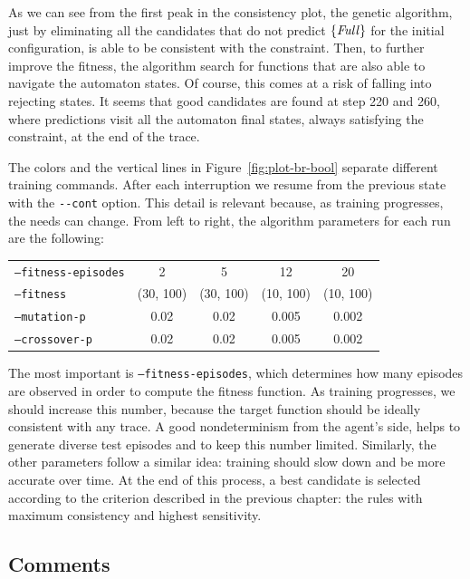 As we can see from the first peak in the consistency plot, the genetic
algorithm, just by eliminating all the candidates that do not predict
$\{\text{\textit{Full}}\}$ for the initial configuration, is able to be consistent
with the constraint. Then, to further improve the fitness, the algorithm
search for functions that are also able to navigate the automaton states. Of
course, this comes at a risk of falling into rejecting states.
It seems that good candidates are found at step 220 and 260, where predictions
visit all the automaton final states, always satisfying the constraint, at the
end of the trace.

The colors and the vertical lines in Figure~\ref{fig:plot-br-bool} separate
different training commands. After each interruption we resume from the
previous state with the \verb|--cont| option. This detail is relevant because,
as training progresses, the needs can change. From left to right, the
algorithm parameters for each run are the following:
\begin{center}
\begin{tabular}{l*4c}
	\texttt{--fitness-episodes} & 2 & 5 & 12 & 20 \\
	\texttt{--fitness} & (30, 100) & (30, 100) & (10, 100) & (10, 100) \\
	\texttt{--mutation-p} & 0.02 & 0.02 & 0.005 & 0.002 \\
	\texttt{--crossover-p} & 0.02 & 0.02 & 0.005 & 0.002
\end{tabular}
\end{center}
The most important is \texttt{--fitness-episodes}, which determines how many
episodes are observed in order to compute the fitness function. As training
progresses, we should increase this number, because the target function should
be ideally consistent with any trace. A good nondeterminism from the agent's
side, helps to generate diverse test episodes and to keep this number limited.
Similarly, the other parameters follow a similar idea: training should slow
down and be more accurate over time.  At the end of this process, a best
candidate is selected according to the criterion described in the previous
chapter: the rules with maximum consistency and highest sensitivity.


\subsection{Comments}

